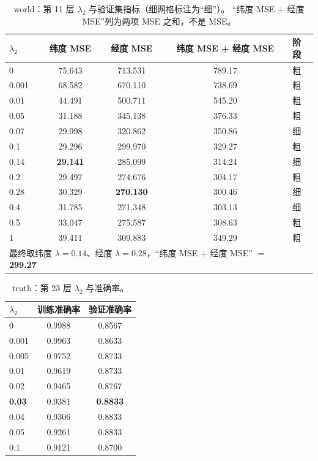 \documentclass[UTF8,a4paper]{ctexart}
\begin{document}
\begin{table}[htbp]
\centering
\caption{world：第 11 层 $\lambda_2$ 与验证集指标（细网格标注为“细”）。
“纬度 MSE + 经度 MSE”列为两项 MSE 之和，不是 MSE。}
\begin{tabular}{lcccl}
\toprule
$\lambda_2$ & 纬度 MSE & 经度 MSE & 纬度 MSE + 经度 MSE & 阶段 \\
\midrule
0      & 75.643 & 713.531 & 789.17 & 粗 \\
0.001  & 68.582 & 670.110 & 738.69 & 粗 \\
0.01   & 44.491 & 500.711 & 545.20 & 粗 \\
0.05   & 31.188 & 345.138 & 376.33 & 粗 \\
0.07   & 29.998 & 320.862 & 350.86 & 细 \\
0.1    & 29.296 & 299.970 & 329.27 & 粗 \\
0.14   & \textbf{29.141} & 285.099 & 314.24 & 细 \\
0.2    & 29.497 & 274.676 & 304.17 & 粗 \\
0.28   & 30.329 & \textbf{270.130} & 300.46 & 细 \\
0.4    & 31.785 & 271.348 & 303.13 & 细 \\
0.5    & 33.047 & 275.587 & 308.63 & 粗 \\
1      & 39.411 & 309.883 & 349.29 & 粗 \\
\midrule
\multicolumn{4}{l}{最终取纬度 $\lambda=0.14$、经度 $\lambda=0.28$，“纬度 MSE + 经度 MSE” $=$ \textbf{299.27}} & \\
\bottomrule
\end{tabular}
\end{table}

\begin{table}[htbp]
\centering
\caption{truth：第 23 层 $\lambda_2$ 与准确率。}
\begin{tabular}{lcc}
\toprule
$\lambda_2$ & 训练准确率 & 验证准确率 \\
\midrule
0      & 0.9988 & 0.8567 \\
0.001  & 0.9963 & 0.8633 \\
0.005  & 0.9752 & 0.8733 \\
0.01   & 0.9619 & 0.8733 \\
0.02   & 0.9465 & 0.8767 \\
\textbf{0.03} & 0.9381 & \textbf{0.8833} \\
0.04   & 0.9306 & 0.8833 \\
0.05   & 0.9261 & 0.8833 \\
0.1    & 0.9121 & 0.8700 \\
\bottomrule
\end{tabular}
\end{table}
\end{document}
